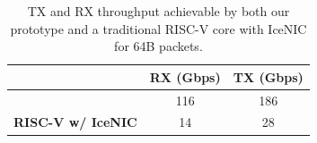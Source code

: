 
\begin{table}
\begin{center}
\begin{tabular}{c|c|c}
                          & \textbf{RX (Gbps)} & \textbf{TX (Gbps)} \\ \toprule
\textbf{\name{}}          & 116                & 186                \\
\textbf{RISC-V w/ IceNIC} & 14                 & 28                 \\
\end{tabular}
\caption{TX and RX throughput achievable by both our \name{} prototype and a traditional RISC-V core with IceNIC for 64B packets.}
\label{tab:throughput}
\end{center}
\end{table}


